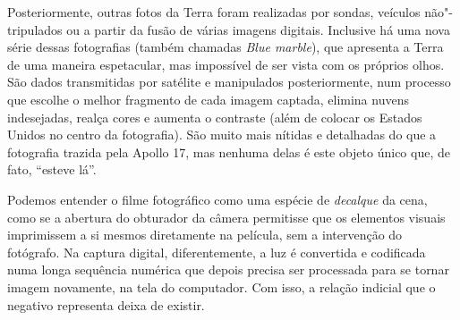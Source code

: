 Posteriormente, outras fotos da Terra foram realizadas por sondas,
veículos não"-tripulados ou a partir da fusão de várias imagens digitais.
Inclusive há uma nova série dessas fotografias (também chamadas
\emph{Blue marble}), que apresenta a Terra de uma maneira espetacular,
mas impossível de ser vista com os próprios olhos. São dados
transmitidas por satélite e manipulados posteriormente, num processo que
escolhe o melhor fragmento de cada imagem captada, elimina nuvens
indesejadas, realça cores e aumenta o contraste (além de colocar os
Estados Unidos no centro da fotografia). São muito mais nítidas e
detalhadas do que a fotografia trazida pela Apollo 17, mas nenhuma delas
é este objeto único que, de fato, ``esteve lá''.

Podemos entender o filme fotográfico como uma espécie de \emph{decalque}
da cena, como se a abertura do obturador da câmera permitisse que os
elementos visuais imprimissem a si mesmos diretamente na película, sem a
intervenção do fotógrafo. Na captura digital, diferentemente, a luz é
convertida e codificada numa longa sequência numérica que depois precisa
ser processada para se tornar imagem novamente, na tela do computador.
Com isso, a relação indicial que o negativo representa deixa de existir.

